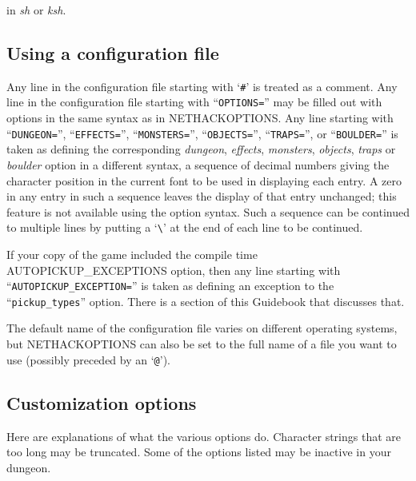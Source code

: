 \nd in {\it sh\/} or {\it ksh}.

\subsection*{Using a configuration file}

Any line in the configuration file starting with `{\tt \#}' is treated as a comment.
Any line in the configuration file starting with ``{\tt OPTIONS=}'' may be
filled out with options in the same syntax as in NETHACKOPTIONS.
Any line starting with ``{\tt DUNGEON=}'', ``{\tt EFFECTS=}'',
``{\tt MONSTERS=}'', ``{\tt OBJECTS=}'', ``{\tt TRAPS=}'', 
or ``{\tt BOULDER=}''
is taken as defining the corresponding {\it dungeon},
{\it effects}, {\it monsters}, {\it objects}, {\it traps\/} or
{\it boulder\/} option in a different syntax,
a sequence of decimal numbers giving the character position
in the current font to be used in displaying each entry.
A zero in any entry in such a sequence leaves the display of that
entry unchanged; this feature is not available using the option syntax.
Such a sequence can be continued to multiple lines by putting a
`{\tt \verb+\+}' at the end of each line to be continued.

If your copy of the game included the compile time AUTOPICKUP\_EXCEPTIONS 
option, then any line starting with ``{\tt AUTOPICKUP\_EXCEPTION=}'' 
is taken as defining an exception to the ``{\tt pickup\_types}'' option.
There is a section of this Guidebook that discusses that.

The default name of the configuration file varies on different
operating systems, but NETHACKOPTIONS can also be set to
the full name of a file you want to use (possibly preceded by an `{\tt @}').

\subsection*{Customization options}

Here are explanations of what the various options do.
Character strings that are too long may be truncated.
Some of the options listed may be inactive in your dungeon.

